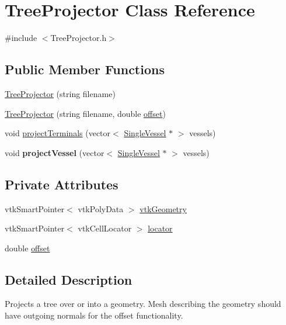 \hypertarget{class_tree_projector}{}\section{Tree\+Projector Class Reference}
\label{class_tree_projector}


{\ttfamily \#include $<$Tree\+Projector.\+h$>$}

\subsection*{Public Member Functions}
\begin{DoxyCompactItemize}
\item 
\hyperlink{class_tree_projector_a8a2c3b716ebb81e1bfbe7cbfe65a84de}{Tree\+Projector} (string filename)
\item 
\hyperlink{class_tree_projector_ae40d424550e6551e1f772fe65d223e95}{Tree\+Projector} (string filename, double \hyperlink{class_tree_projector_ab6db6b968e5dc88efc732ef928e0dadc}{offset})
\item 
void \hyperlink{class_tree_projector_a7dc95446e85e5169d5777af5abbcd9a7}{project\+Terminals} (vector$<$ \hyperlink{class_single_vessel}{Single\+Vessel} $\ast$ $>$ vessels)
\item 
void {\bfseries project\+Vessel} (vector$<$ \hyperlink{class_single_vessel}{Single\+Vessel} $\ast$ $>$ vessels)\hypertarget{class_tree_projector_a98e0394085cbb9698587cee8636cf56f}{}\label{class_tree_projector_a98e0394085cbb9698587cee8636cf56f}

\end{DoxyCompactItemize}
\subsection*{Private Attributes}
\begin{DoxyCompactItemize}
\item 
vtk\+Smart\+Pointer$<$ vtk\+Poly\+Data $>$ \hyperlink{class_tree_projector_aca0dc09b8d4f959028f28e13f10d09f6}{vtk\+Geometry}
\item 
vtk\+Smart\+Pointer$<$ vtk\+Cell\+Locator $>$ \hyperlink{class_tree_projector_af67b13f1149ad2ee0b265b09fe4c7e4f}{locator}
\item 
double \hyperlink{class_tree_projector_ab6db6b968e5dc88efc732ef928e0dadc}{offset}
\end{DoxyCompactItemize}


\subsection{Detailed Description}
Projects a tree over or into a geometry. Mesh describing the geometry should have outgoing normals for the offset functionality. 

